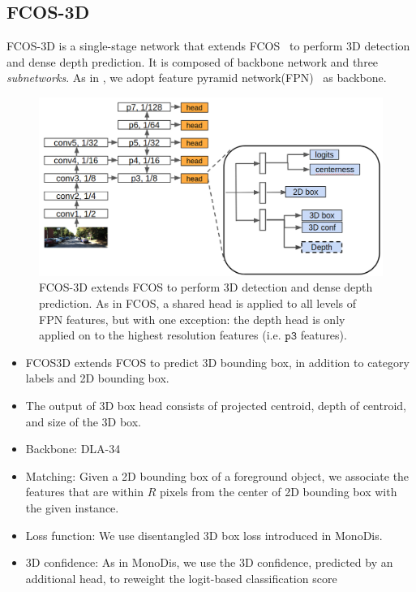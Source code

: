 \subsection{FCOS-3D}
FCOS-3D is a single-stage network that extends FCOS~\cite{tian2019fcos} to perform 3D detection and dense depth prediction. It is composed of backbone network and three \emph{subnetworks}. As in \cite{tian2019fcos}, we adopt feature pyramid network(FPN)~\cite{lin2016fpn} as backbone.
\begin{figure}[h]
	\centering
	\includegraphics[width=1.0\columnwidth]{figures/fcos3d_arch.png}
	\caption{FCOS-3D extends FCOS to perform 3D detection and dense depth prediction. As in FCOS, a shared head is applied to all levels of FPN features, but with one exception: the depth head is only applied on to the highest resolution features (i.e. $\texttt{p3}$ features).}
\end{figure}

\begin{itemize}
    \item FCOS3D extends FCOS to predict 3D bounding box, in addition to category labels and 2D bounding box.
    \item The output of 3D box head consists of projected centroid, depth of centroid, and size of the 3D box.
    \item Backbone: DLA-34
    \item Matching: Given a 2D bounding box of a foreground object, we associate the features that are within $R$ pixels from the center of 2D bounding box with the given instance.
    \item Loss function: We use disentangled 3D box loss introduced in MonoDis.
    \item 3D confidence: As in MonoDis, we use the 3D confidence, predicted by an additional head, to reweight the logit-based classification score
\end{itemize}

